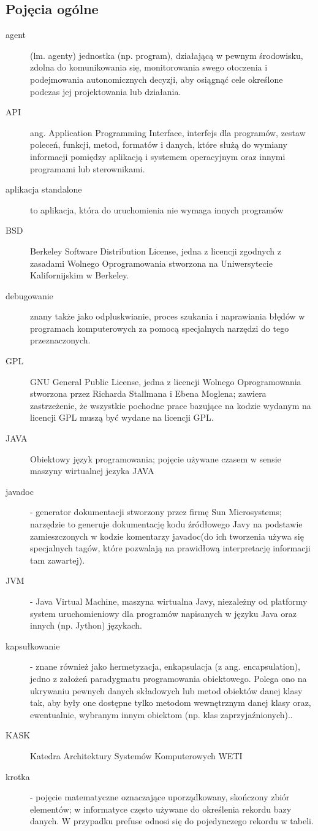 \subsection{Pojęcia ogólne}
\begin{description}
	\item[agent] (lm. agenty) jednostka (np. program), działającą w pewnym środowisku, zdolna do komunikowania się, monitorowania swego otoczenia i podejmowania autonomicznych decyzji, aby osiągnąć cele określone podczas jej projektowania lub działania.
	\item[API] ang. Application Programming Interface, interfejs dla programów, zestaw poleceń, funkcji, metod, formatów i danych, które służą do wymiany informacji pomiędzy aplikacją i systemem operacyjnym oraz innymi programami lub sterownikami.
	\item[aplikacja standalone] to aplikacja, która do uruchomienia nie wymaga innych programów

	\item[BSD] Berkeley Software Distribution License, jedna z licencji zgodnych z zasadami Wolnego Oprogramowania stworzona na Uniwersytecie Kalifornijskim w Berkeley.
	\item[debugowanie] znany także jako odpluskwianie, proces szukania i naprawiania błędów	w programach komputerowych za pomocą specjalnych narzędzi do tego przeznaczonych.
	\item[GPL] GNU General Public License, jedna z licencji Wolnego Oprogramowania stworzona przez Richarda Stallmana i Ebena Moglena; zawiera zastrzeżenie, że wszystkie pochodne prace bazujące na kodzie wydanym na licencji GPL muszą być wydane na licencji GPL.

	\item[JAVA] Obiektowy język programowania; pojęcie używane czasem w sensie maszyny wirtualnej jezyka JAVA
	\item[javadoc] - generator dokumentacji stworzony przez firmę Sun Microsystems; narzędzie to generuje dokumentację kodu źródłowego Javy na podstawie zamieszczonych w kodzie komentarzy javadoc(do ich tworzenia używa się specjalnych tagów, które pozwalają na prawidłową interpretację informacji tam zawartej).
	\item[JVM] - Java Virtual Machine, maszyna wirtualna Javy, niezależny od platformy system uruchomieniowy dla programów napisanych w języku Java oraz innych (np. Jython) językach.

	\item[kapsułkowanie] - znane również jako hermetyzacja, enkapsulacja (z ang. encapsulation), jedno z założeń paradygmatu programowania obiektowego. Polega ono na ukrywaniu pewnych danych składowych lub metod obiektów danej klasy tak, aby były one dostępne tylko metodom wewnętrznym danej klasy oraz, ewentualnie, wybranym innym obiektom (np. klas zaprzyjaźnionych)..
	\item[KASK] Katedra Architektury Systemów Komputerowych WETI
	\item[krotka] - pojęcie matematyczne oznaczające uporządkowany, skończony zbiór elementów; w informatyce często używane do określenia rekordu bazy danych. W przypadku prefuse odnosi się do pojedynczego rekordu w tabeli.


\end{description}
